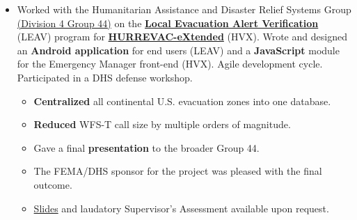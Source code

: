 \documentclass[11pt]{article}
\begin{document}
\begin{itemize}

	\item Worked with the Humanitarian Assistance and Disaster Relief Systems Group \href{https://www.ll.mit.edu/mission/division4.html#gp44}{(Division 4 Group 44)} on the \href{https://www.dhs.gov/publication/national-hurricane-program-technology-modernization-local-evacuation-alert-verification}{\textbf{Local Evacuation Alert Verification}} (LEAV) program for \href{https://www.dhs.gov/publication/national-hurricane-program-technology-modernization-hurrevac-extended-hv-x}{\textbf{HURREVAC-eXtended}} (HVX). Wrote and designed an \textbf{Android application} for end users (LEAV) and a \textbf{JavaScript} module for the Emergency Manager front-end (HVX). Agile development cycle. Participated in a DHS defense workshop.
	\begin{itemize}[noitemsep]
		\item \textbf{Centralized} all continental U.S. evacuation zones into one database.
		\item \textbf{Reduced} WFS-T call size by multiple orders of magnitude.
		\item Gave a final \textbf{presentation} to the broader Group 44. 
		\item The FEMA/DHS sponsor for the project was pleased with the final outcome.
		\item \href{https://docs.google.com/presentation/d/1d6u7eK2fBJElrRpEn1KlkTfReKO_tHj5iCAGb6vgtmg/}{Slides} and laudatory Supervisor's Assessment available upon request.
	\end{itemize}
\end{itemize}
\end{document}
